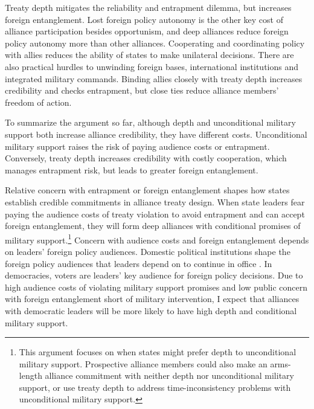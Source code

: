 \documentclass[12pt]{article}
\begin{document}
Treaty depth mitigates the reliability and entrapment dilemma, but increases foreign entanglement. 
Lost foreign policy autonomy is the other key cost of alliance participation besides opportunism, and deep alliances reduce foreign policy autonomy more than other alliances.
Cooperating and coordinating policy with allies reduces the ability of states to make unilateral decisions. 
There are also practical hurdles to unwinding foreign bases, international institutions and integrated military commands. 
Binding allies closely with treaty depth increases credibility and checks entrapment, but close ties reduce alliance members' freedom of action. 


To summarize the argument so far, although depth and unconditional military support both increase alliance credibility, they have different costs. 
Unconditional military support raises the risk of paying audience costs or entrapment. 
Conversely, treaty depth increases credibility with costly cooperation, which manages entrapment risk, but leads to greater foreign entanglement.   


Relative concern with entrapment or foreign entanglement shapes how states establish credible commitments in alliance treaty design. 
When state leaders fear paying the audience costs of treaty violation to avoid entrapment and can accept foreign entanglement, they will form deep alliances with conditional promises of military support.\footnote{This argument focuses on when states might prefer depth to unconditional military support. Prospective alliance members could also make an arms-length alliance commitment with neither depth nor unconditional military support, or use treaty depth to address time-inconsistency problems with unconditional military support.}
Concern with audience costs and foreign entanglement depends on leaders' foreign policy audiences.  
Domestic political institutions shape the foreign policy audiences that leaders depend on to continue in office \citep{Weeks2008}. 
In democracies, voters are leaders' key audience for foreign policy decisions.  
Due to high audience costs of violating military support promises and low public concern with foreign entanglement short of military intervention, I expect that alliances with democratic leaders will be more likely to have high depth and conditional military support. 
\end{document}
